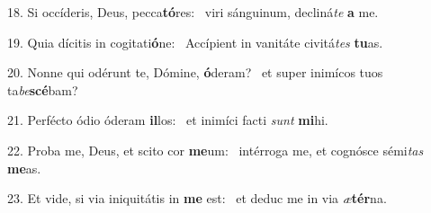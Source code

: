 18. Si occíderis, Deus, pecca\textbf{tó}res: \ast\  viri sánguinum, decliná\textit{te} \textbf{a} me.\

19. Quia dícitis in cogitati\textbf{ó}ne: \ast\  Accípient in vanitáte civitá\textit{tes} \textbf{tu}as.\

20. Nonne qui odérunt te, Dómine, \textbf{ó}deram? \ast\  et super inimícos tuos ta\textit{be}\textbf{scé}bam?\

21. Perfécto ódio óderam \textbf{il}los: \ast\  et inimíci facti \textit{sunt} \textbf{mi}hi.\

22. Proba me, Deus, et scito cor \textbf{me}um: \ast\  intérroga me, et cognósce sémi\textit{tas} \textbf{me}as.\

23. Et vide, si via iniquitátis in \textbf{me} est: \ast\  et deduc me in via \textit{æ}\textbf{tér}na.\

